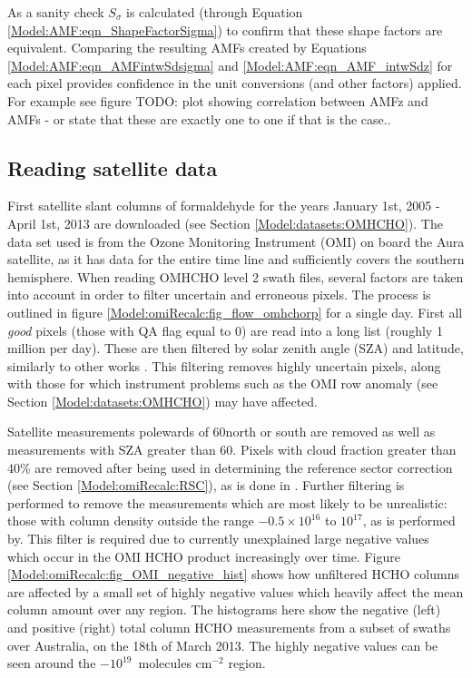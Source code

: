     As a sanity check $S_\sigma$ is calculated (through Equation \ref{Model:AMF:eqn_ShapeFactorSigma}) to confirm that these shape factors are equivalent.
    Comparing the resulting AMFs created by Equations \ref{Model:AMF:eqn_AMFintwSdsigma} and \ref{Model:AMF:eqn_AMF_intwSdz} for each pixel provides confidence in the unit conversions (and other factors) applied.
    For example see figure TODO: plot showing correlation between AMFz and AMFs - or state that these are exactly one to one if that is the case..
    
    
    
  \subsection{Reading satellite data}
    
    First satellite slant columns of formaldehyde for the years January 1st, 2005 - April 1st, 2013 are downloaded (see Section \ref{Model:datasets:OMHCHO}).
    The data set used is from the Ozone Monitoring Instrument (OMI) on board the Aura satellite, as it has data for the entire time line and sufficiently covers the southern hemisphere.
    When reading OMHCHO level 2 swath files, several factors are taken into account in order to filter uncertain and erroneous pixels.
    The process is outlined in figure  \ref{Model:omiRecalc:fig_flow_omhchorp} for a single day.
    First all \textit{good} pixels (those with QA flag equal to 0) are read into a long list (roughly 1 million per day).
    These are then filtered by solar zenith angle (SZA) and latitude, similarly to other works \parencite[e.g.,]{Marais2012, Barkley2013, Bauwens2016, Zhu2016}.
    This filtering removes highly uncertain pixels, along with those for which instrument problems such as the OMI row anomaly (see Section \ref{Model:datasets:OMHCHO}) may have affected.
    
    Satellite measurements polewards of 60\degr north or south are removed as well as measurements with SZA greater than 60\degr.
    Pixels with cloud fraction greater than 40\% are removed after being used in determining the reference sector correction (see Section \ref{Model:omiRecalc:RSC}), as is done in \textcite{Abad2015, DeSmedt2015}.
    Further filtering is performed to remove the measurements which are most likely to be unrealistic: those with column density outside the range $-0.5 \times 10^{16}$ to $10^{17} $\moleccm, as is performed by\textcite{Zhu2016}.
    This filter is required due to currently unexplained large negative values which occur in the OMI HCHO product increasingly over time.
    Figure \ref{Model:omiRecalc:fig_OMI_negative_hist} shows how unfiltered HCHO columns are affected by a small set of highly negative values which heavily affect the mean column amount over any region.
    The histograms here show the negative (left) and positive (right) total column HCHO measurements from a subset of swaths over Australia, on the 18th of March 2013.
    The highly negative values can be seen around the $-10^{19}$~molecules cm$^{-2}$ region.
    
